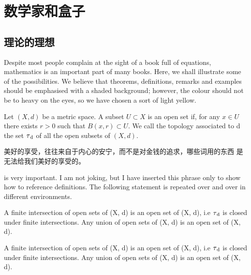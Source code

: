 \setchapterpreamble[u]{\margintoc}
\chapter{数学家和盒子}

\section{理论的理想}

Despite most people complain at the sight of a book full of equations, 
mathematics is an important part of many books. Here, we shall 
illustrate some of the possibilities. We believe that theorems, 
definitions, remarks and examples should be emphasised with a shaded 
background; however, the colour should not be to heavy on the eyes, so 
we have chosen a sort of light yellow.

\begin{definition}
Let $(X, d)$ be a metric space. A subset $U \subset X$ is an open set 
if, for any $x \in U$ there exists $r > 0$ such that $B(x, r) \subset 
U$. We call the topology associated to d the set $\tau\textsubscript{d}$ 
of all the open subsets of $(X, d).$
\end{definition}

\begin{definition}
	美好的享受，往往来自于内心的安宁，而不是对金钱的追求，哪些词用的东西
	是无法给我们美好的享受的。
\end{definition}

 is very important. I am not joking, but I have inserted 
this phrase only to show how to reference definitions. The following 
statement is repeated over and over in different environments.

\begin{theorem}
A finite intersection of open sets of (X, d) is an open set of (X, d), 
i.e $\tau\textsubscript{d}$ is closed under finite intersections. Any 
union of open sets of (X, d) is an open set of (X, d).
\end{theorem}

\begin{proposition}
A finite intersection of open sets of (X, d) is an open set of (X, d), 
i.e $\tau\textsubscript{d}$ is closed under finite intersections. Any 
union of open sets of (X, d) is an open set of (X, d).
\end{proposition}

